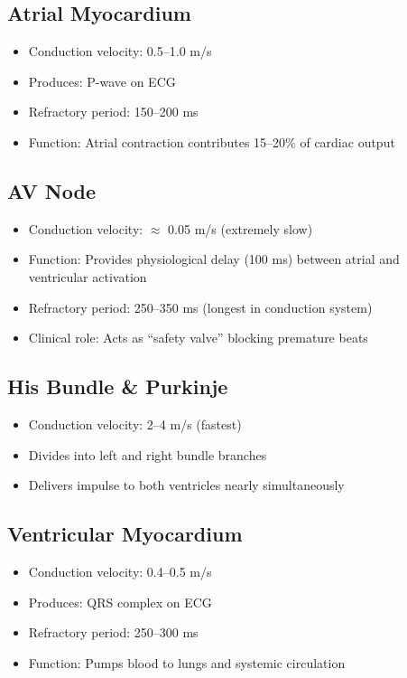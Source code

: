 \documentclass[12pt,oneside,a4paper]{book}
\begin{document}
\subsection{Atrial Myocardium}
\begin{itemize}
  \item Conduction velocity: 0.5--1.0 m/s
  \item Produces: P-wave on ECG
  \item Refractory period: 150--200 ms
  \item Function: Atrial contraction contributes 15--20\% of cardiac output
\end{itemize}

\subsection{AV Node}
\begin{itemize}
  \item Conduction velocity: $\approx$ 0.05 m/s (extremely slow)
  \item Function: Provides physiological delay (100 ms) between atrial and ventricular activation
  \item Refractory period: 250--350 ms (longest in conduction system)
  \item Clinical role: Acts as ``safety valve'' blocking premature beats
\end{itemize}

\subsection{His Bundle \& Purkinje}
\begin{itemize}
  \item Conduction velocity: 2--4 m/s (fastest)
  \item Divides into left and right bundle branches
  \item Delivers impulse to both ventricles nearly simultaneously
\end{itemize}

\subsection{Ventricular Myocardium}
\begin{itemize}
  \item Conduction velocity: 0.4--0.5 m/s
  \item Produces: QRS complex on ECG
  \item Refractory period: 250--300 ms
  \item Function: Pumps blood to lungs and systemic circulation
\end{itemize}
\end{document}
